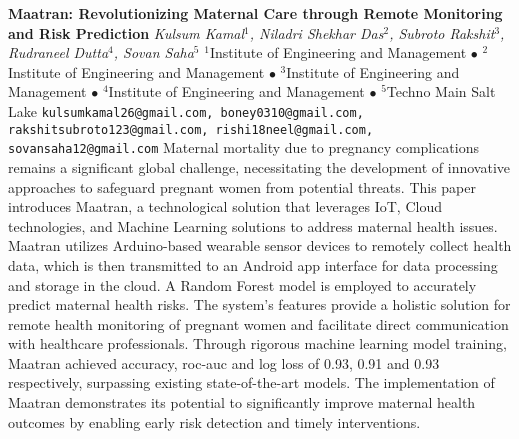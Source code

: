 
    \begin{conf-abstract}[]
        {\textbf{Maatran: Revolutionizing Maternal Care through Remote Monitoring and Risk Prediction}}
        {\textit{Kulsum Kamal$^{1}$, Niladri  Shekhar Das$^{2}$, Subroto Rakshit$^{3}$, Rudraneel Dutta$^{4}$, Sovan Saha$^{5}$}}
        {$^{1}$Institute of Engineering and Management $\bullet$ $^{2}$Institute of Engineering and Management $\bullet$ $^{3}$Institute of Engineering and Management $\bullet$ $^{4}$Institute of Engineering and Management $\bullet$ $^{5}$Techno Main Salt Lake}
        {\texttt{kulsumkamal26@gmail.com, boney0310@gmail.com, rakshitsubroto123@gmail.com, rishi18neel@gmail.com, sovansaha12@gmail.com}}
        {Maternal mortality due to pregnancy complications remains a significant global challenge, necessitating the development of innovative approaches to safeguard pregnant women from potential threats. This paper introduces Maatran, a technological solution that leverages IoT, Cloud technologies, and Machine Learning solutions to address maternal health issues. Maatran utilizes Arduino-based wearable sensor devices to remotely collect health data, which is then transmitted to an Android app interface for data processing and storage in the cloud. A Random Forest model is employed to accurately predict maternal health risks. The system's features provide a holistic solution for remote health monitoring of pregnant women and facilitate direct communication with healthcare professionals. Through rigorous machine learning model training, Maatran achieved accuracy, roc-auc and log loss of 0.93, 0.91 and 0.93 respectively, surpassing existing state-of-the-art models. The implementation of Maatran demonstrates its potential to significantly improve maternal health outcomes by enabling early risk detection and timely interventions.}
    \end{conf-abstract}
        